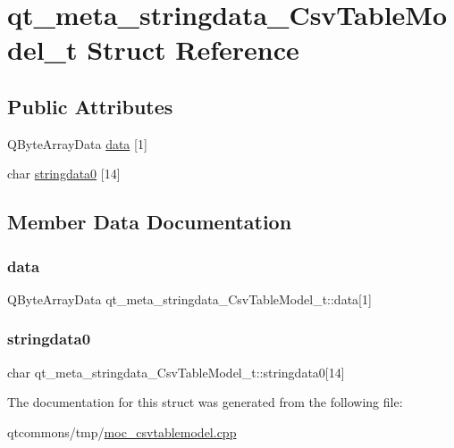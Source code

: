 \hypertarget{structqt__meta__stringdata___csv_table_model__t}{}\section{qt\+\_\+meta\+\_\+stringdata\+\_\+\+Csv\+Table\+Model\+\_\+t Struct Reference}
\label{structqt__meta__stringdata___csv_table_model__t}
\subsection*{Public Attributes}
\begin{DoxyCompactItemize}
\item 
Q\+Byte\+Array\+Data \mbox{\hyperlink{structqt__meta__stringdata___csv_table_model__t_a3ad5f49a238cdec75db7e8532a5ff187}{data}} \mbox{[}1\mbox{]}
\item 
char \mbox{\hyperlink{structqt__meta__stringdata___csv_table_model__t_a925e732794f8fa60b58c088f2c90e636}{stringdata0}} \mbox{[}14\mbox{]}
\end{DoxyCompactItemize}


\subsection{Member Data Documentation}
\mbox{\label{structqt__meta__stringdata___csv_table_model__t_a3ad5f49a238cdec75db7e8532a5ff187}} 
\subsubsection{\texorpdfstring{data}{data}}
{\footnotesize\ttfamily Q\+Byte\+Array\+Data qt\+\_\+meta\+\_\+stringdata\+\_\+\+Csv\+Table\+Model\+\_\+t\+::data\mbox{[}1\mbox{]}}

\mbox{\label{structqt__meta__stringdata___csv_table_model__t_a925e732794f8fa60b58c088f2c90e636}} 
\subsubsection{\texorpdfstring{stringdata0}{stringdata0}}
{\footnotesize\ttfamily char qt\+\_\+meta\+\_\+stringdata\+\_\+\+Csv\+Table\+Model\+\_\+t\+::stringdata0\mbox{[}14\mbox{]}}



The documentation for this struct was generated from the following file\+:\begin{DoxyCompactItemize}
\item 
qtcommons/tmp/\mbox{\hyperlink{moc__csvtablemodel_8cpp}{moc\+\_\+csvtablemodel.\+cpp}}\end{DoxyCompactItemize}
